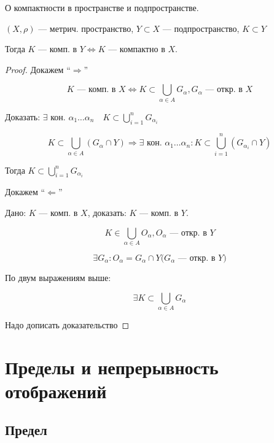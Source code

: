 \begin{theorem}
    О компактности в пространстве и подпространстве.
    
    $(X,\rho)$ --- метрич. пространство, $Y\subset X$ --- подпространство, $K\subset Y$

    Тогда $K$ --- комп. в $Y \Leftrightarrow K$ --- компактно в $X$.
\end{theorem}

\begin{proof}
    Докажем ``$\Rightarrow$''

    $$K\text{ --- комп. в }X \Leftrightarrow K\subset\bigcup\limits_{\alpha\in A} G_\alpha, G_\alpha\text{ --- откр. в } X$$

    Доказать: $\exists$ кон. $\alpha_1\ldots\alpha_n \quad K\subset\bigcup\limits_{i=1}^n G_{\alpha_i}$

    $$K\subset\bigcup\limits_{\alpha\in A}(G_\alpha\cap Y) \Rightarrow \exists\text{ кон. } \alpha_1\ldots\alpha_n: K\subset \bigcup\limits_{i=1}^n(G_{\alpha_i}\cap Y)$$

    Тогда $K\subset \bigcup\limits_{i=1}^n G_{\alpha_i}$

    Докажем ``$\Leftarrow$''

    Дано: $K$ --- комп. в $X$, доказать: $K$ --- комп. в $Y$.

    $$K\in\bigcup\limits_{\alpha\in A} O_\alpha, O_\alpha\text{ --- откр. в }Y$$

    $$\exists G_\alpha : O_\alpha=G_\alpha\cap Y\textit{($G_\alpha$ --- откр. в $Y$)}$$

    По двум выражениям выше:

    $$\exists K\subset \bigcup\limits_{\alpha\in A} G_\alpha$$


    Надо дописать доказательство
\end{proof}

\section{Пределы и непрерывность отображений}

\subsection{Предел}

